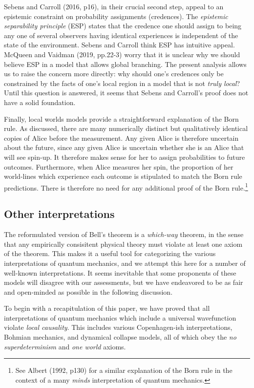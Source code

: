 \documentclass[12pt]{article}
\begin{document}
Sebens and Carroll (2016, p16), in their crucial second step, appeal to an epistemic constraint on probability assignments (credences). The \textit{epistemic separability principle} (ESP) states that the credence one should assign to being any one of several observers having identical experiences is independent of the state of the environment. Sebens and Carroll think ESP has intuitive appeal. McQueen and Vaidman (2019, pp.22-3) worry that it is unclear why we should believe ESP in a model that allows global branching. The present analysis allows us to raise the concern more directly: why should one's credences only be constrained by the facts of one's local region in a model that is not \textit{truly local}? Until this question is answered, it seems that Sebens and Carroll's proof does not have a solid foundation. 

Finally, local worlds models provide a straightforward explanation of the Born rule. As discussed, there are many numerically distinct but qualitatively identical copies of Alice before the measurement. Any given Alice is therefore uncertain about the future, since any given Alice is uncertain whether she is an Alice that will see spin-up. It therefore makes sense for her to assign probabilities to future outcomes. Furthermore, when Alice measures her spin, the proportion of her world-lines which experience each outcome is stipulated to match the Born rule predictions. There is therefore no need for any additional proof of the Born rule.\footnote{See Albert (1992, p130) for a similar explanation of the Born rule in the context of a many \textit{minds} interpretation of quantum mechanics.}



\subsection{Other interpretations}   \label{Interps}

The reformulated version of Bell's theorem is a \textit{which-way} theorem, in the sense that any empirically consisitent physical theory must violate at least one axiom of the theorem. This makes it a useful tool for categorizing the various interpretations of quantum mechanics, and we attempt this here for a number of well-known interpretations. It seems inevitable that some proponents of these models will disagree with our assessments, but we have endeavored to be as fair and open-minded as possible in the following discussion.

To begin with a recapitulation of this paper, we have proved that all interpretations of quantum mechanics which include a universal wavefunction violate \textit{local causality}.  This includes various Copenhagen-ish interpretations, Bohmian mechanics, and dynamical collapse models, all of which obey the \textit{no superdeterminism} and \textit{one world} axioms.
\end{document}
